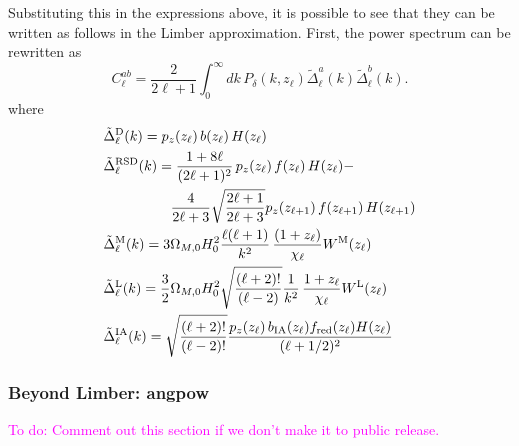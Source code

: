 \documentclass[\docopts]{\docclass}
\newcommand{\todo}[1]{\textcolor{magenta}{To do: #1}}
\begin{document}
Substituting this in the expressions above, it is possible to see that they can be written as follows in the Limber approximation. First, the power spectrum can be rewritten as
\begin{equation}
 C^{ab}_\ell=\frac{2}{2\ell+1}\int_0^\infty dk\,P_\delta\left(k,z_\ell\right)
 \tilde{\Delta}^a_\ell(k)\tilde{\Delta}^b_\ell(k).
\end{equation}
where
\begin{align}
 &\tilde{\Delta}_\ell^{\rm D}(k)=p_z(z_\ell)\,b(z_\ell)\,H(z_\ell)\\
 &\tilde{\Delta}_\ell^{\rm RSD}(k)=
 \frac{1+8\ell}{(2\ell+1)^2}\,p_z(z_\ell)\,f(z_\ell)\,H(z_\ell)-\\
 &\hspace{48pt}\frac{4}{2\ell+3}\sqrt{\frac{2\ell+1}{2\ell+3}}p_z(z_{\ell+1})\,f(z_{\ell+1})\,H(z_{\ell+1})\\
 &\tilde{\Delta}_\ell^{\rm M}(k)=3\Omega_{M,0}H_0^2\frac{\ell(\ell+1)}{k^2}\,
 \frac{(1+z_\ell)}{\chi_\ell}W^{\rm M}(z_\ell)\\
 &\tilde{\Delta}_\ell^{\rm L}(k)=\frac{3}{2}\Omega_{M,0}H_0^2\sqrt{\frac{(\ell+2)!}{(\ell-2)}}\frac{1}{k^2}\,
 \frac{1+z_\ell}{\chi_\ell}W^{\rm L}(z_\ell)\\
 &\tilde{\Delta}_\ell^{\rm IA}(k)=\sqrt{\frac{(\ell+2)!}{(\ell-2)!}}\frac{p_z(z_\ell)\,b_{\rm IA}(z_\ell)f_{\rm red}(z_\ell)H(z_\ell)}{(\ell+1/2)^2}
\end{align}

\subsubsection{Beyond Limber: angpow}

\todo{Comment out this section if we don't make it to public release.}


\end{document}
